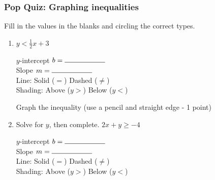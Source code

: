 \documentclass[12pt, twoside]{article}
\begin{document}
\subsubsection*{Pop Quiz: Graphing inequalities}
Fill in the values in the blanks and circling the correct types.
  \begin{enumerate}

    \item $\displaystyle y < \frac{1}{2} x +3 $

      \vspace{0.25cm}
      \begin{multicols}{2}
        $y$-intercept $b= \rule{2cm}{0.15mm}$ \\[0.5cm]
        Slope \hspace{0.7cm} $m= \rule{2cm}{0.15mm}$\\[0.5cm]

        Line: \hspace{1cm} Solid ($=$) \hspace{0.5cm} Dashed ($\neq$)\\[0.5cm]
        Shading: \hspace{0.3cm} Above ($y>$) \hspace{0.25cm} Below ($y<$)\\
      \end{multicols}
      Graph the inequality (use a pencil and straight edge - 1 point)

      \begin{center} %
      \end{center}

    \item Solve for $y$, then complete. $\displaystyle 2x+ y \geq -4 $

        \vspace{2cm}
        \begin{multicols}{2}
          \raggedcolumns
          $y$-intercept $b= \rule{2cm}{0.15mm}$ \\[0.5cm]
          Slope \hspace{0.7cm} $m= \rule{2cm}{0.15mm}$\\

          Line: \hspace{1cm} Solid ($=$) \hspace{0.5cm} Dashed ($\neq$)\\[0.5cm]
          Shading: \hspace{0.3cm} Above ($y>$) \hspace{0.25cm} Below ($y<$)
        \end{multicols}


\end{enumerate}
\end{document}
